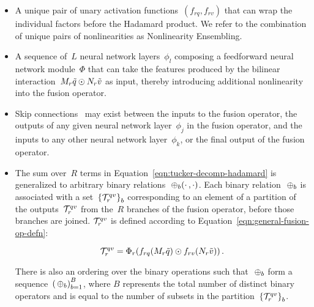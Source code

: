 \begin{itemize}
        \item A unique pair of unary activation
                functions~$(f_{rq}, f_{rv})$ that can wrap the individual
                factors before the Hadamard product. We refer to the
                combination of unique pairs of nonlinearities as Nonlinearity
                Ensembling.

        \item A sequence of~$L$ neural network layers~$\phi_l$ composing a
                feedforward neural network module~$\Phi$ that can take the features
                produced by the bilinear
                interaction~$M_r \tilde{q} \odot N_r \tilde{v}$ as
                input, thereby introducing additional nonlinearity into the
                fusion operator.

        \item Skip connections~\citep{he2016deep, srivastava2015training} may
                exist between the inputs to the fusion operator, the outputs of
                any given neural network layer~$\phi_j$ in the fusion operator,
                and the inputs to any other neural network layer~$\phi_k$, or
                the final output of the fusion operator.

        \item The sum over~$R$ terms in
                Equation~\ref{eqn:tucker-decomp-hadamard} is generalized to
                arbitrary binary relations~$\binopb(\cdot \,, \cdot)$. Each
                binary relation~$\binopb$ is associated with a
                set~${\{\mathcal{T}_r^{q{}v{}}\}}_b$ corresponding to an element of a
                partition of the outputs~$\mathcal{T}_r^{q{}v{}}$ from the~$R$ branches of
                the fusion operator, before those branches are joined.
                $\mathcal{T}_r^{q{}v{}}$ is defined according to
                Equation~\ref{eqn:general-fusion-op-defn}:

                \begin{equation}
                \mathcal{T}_r^{q{}v{}} =
                \Phi_r(f_{rq}{\left(M_r \tilde{q}\right)} \odot f_{rv}{\left(N_r \tilde{v}\right)}) \,.
                \label{eqn:general-fusion-op-defn}
                \end{equation}

                There is also an ordering over the binary operations such
                that~$\binopb$ form a sequence~$\binopseq$, where $B$
                represents the total number of distinct binary operators and is
                equal to the number of subsets in the
                partition~${\{\mathcal{T}_r^{q{}v{}}\}}_b$.


\end{itemize}
